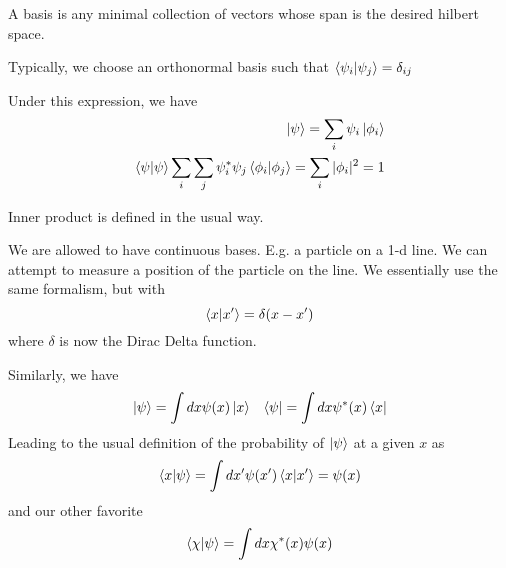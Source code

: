 \documentclass{article}
\theoremstyle{definition}
\begin{document}
A basis is any minimal collection of vectors whose span is the desired hilbert space.

Typically, we choose an orthonormal basis such that 
$\bra{\psi_i}\ket{\psi_j}=\delta_{ij}$

Under this expression, we have
\begin{align}
	\ket{\psi}=\sum_i\psi_i\ket{\phi_i}\\
	\bra{\psi}\ket{\psi}\sum_i\sum_j\psi_i^*\psi_j\bra{\phi_i}\ket{\phi_j}=\sum_i|\phi_i|^2=1
\end{align}

Inner product is defined in the usual way.

We are allowed to have continuous bases. E.g. a particle on a 1-d line.
We can attempt to measure a position of the particle on the line. We essentially use the same formalism, but with
\begin{equation}
	\bra{x}\ket{x'}=\delta(x-x')
\end{equation}
where $\delta$ is now the Dirac Delta function.

Similarly, we have
\begin{align}
	\ket{\psi}=\int dx\psi(x)\ket{x}
	&&
	\bra{\psi}=\int dx\psi^*(x)\bra{x}
\end{align}
Leading to the usual definition of the probability of $\ket{\psi}$ at a given $x$ as
\begin{equation}
	\bra{x}\ket{\psi}=\int dx'\psi(x')\bra{x}\ket{x'}=\psi(x)
\end{equation}
and our other favorite
\begin{equation}
	\bra{\chi}\ket{\psi}=\int dx\chi^*(x)\psi(x)
\end{equation}
\end{document}
